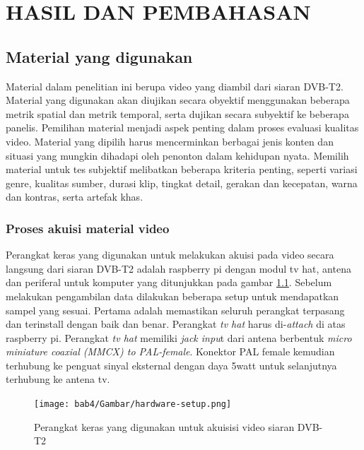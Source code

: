 \chapter{HASIL DAN PEMBAHASAN}

\vspace{1cm}
\section{Material yang digunakan}
\hspace{1,2cm}
Material dalam penelitian ini berupa video yang diambil dari siaran DVB-T2. Material yang digunakan akan diujikan secara obyektif menggunakan beberapa metrik spatial dan metrik temporal, serta dujikan secara subyektif ke beberapa panelis. Pemilihan material menjadi aspek penting dalam proses evaluasi kualitas video. Material yang dipilih harus mencerminkan berbagai jenis konten dan situasi yang mungkin dihadapi oleh penonton dalam kehidupan nyata. Memilih material untuk tes subjektif melibatkan beberapa kriteria penting, seperti variasi genre, kualitas sumber, durasi klip, tingkat detail, gerakan dan kecepatan, warna dan kontras, serta artefak khas.

\subsection{Proses akuisi material video}
\hspace{1,2cm}
Perangkat keras yang digunakan untuk melakukan akuisi pada video secara langsung dari siaran DVB-T2 adalah raspberry pi dengan modul tv hat, antena dan periferal untuk komputer yang ditunjukkan pada gambar \ref{hardware-setup}. Sebelum melakukan pengambilan data dilakukan beberapa setup untuk mendapatkan sampel yang sesuai. Pertama adalah memastikan seluruh perangkat terpasang dan terinstall dengan baik dan benar. Perangkat \textit{tv hat }harus di-\textit{attach} di atas raspberry pi. Perangkat \textit{tv hat} memiliki \textit{jack inpu}t dari antena berbentuk \textit{micro miniature coaxial (MMCX) to PAL-female}. Konektor PAL female kemudian terhubung ke penguat sinyal eksternal dengan daya 5watt untuk selanjutnya terhubung ke antena tv.

\begin{figure}[H]
	\vspace{-0.1cm}
	\begin{center}
		\texttt{[image: bab4/Gambar/hardware-setup.png]}
	\end{center}
	\vspace{-0.2cm}
	\caption{Perangkat keras yang digunakan untuk akuisisi video siaran DVB-T2}
	\label{hardware-setup}
\end{figure}

